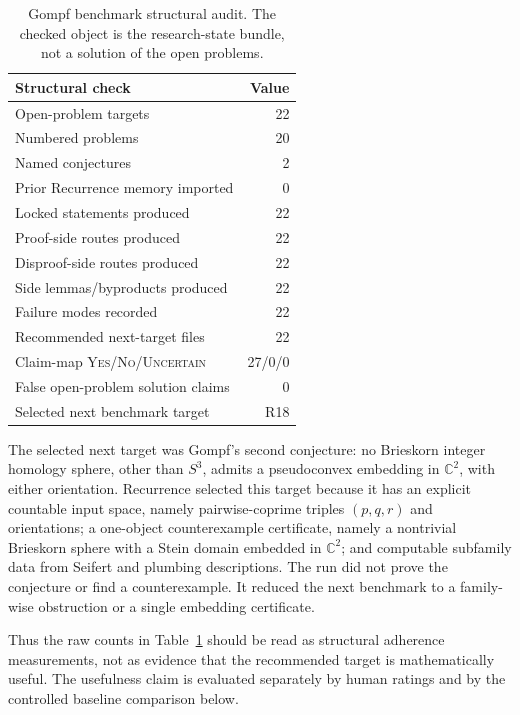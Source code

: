 \documentclass{article}
\theoremstyle{definition}
\theoremstyle{remark}
\begin{document}
\begin{table}[t]
  \caption{Gompf benchmark structural audit. The checked object is the research-state bundle, not a solution of the open problems.}
  \label{tab:gompf-summary}
  \vskip 0.08in
  \centering
  \begin{footnotesize}
  \setlength{\tabcolsep}{4pt}
  \begin{tabular}{lr}
    \toprule
    Structural check & Value \\
    \midrule
    Open-problem targets & 22 \\
    Numbered problems & 20 \\
    Named conjectures & 2 \\
    Prior Recurrence memory imported & 0 \\
    Locked statements produced & 22 \\
    Proof-side routes produced & 22 \\
    Disproof-side routes produced & 22 \\
    Side lemmas/byproducts produced & 22 \\
    Failure modes recorded & 22 \\
    Recommended next-target files & 22 \\
    Claim-map \textsc{Yes}/\textsc{No}/\textsc{Uncertain} & 27/0/0 \\
    False open-problem solution claims & 0 \\
    Selected next benchmark target & R18 \\
    \bottomrule
  \end{tabular}
  \end{footnotesize}
\end{table}

The selected next target was Gompf's second conjecture: no Brieskorn integer homology sphere, other than \(S^3\), admits a pseudoconvex embedding in \(\mathbb{C}^2\), with either orientation. Recurrence selected this target because it has an explicit countable input space, namely pairwise-coprime triples \((p,q,r)\) and orientations; a one-object counterexample certificate, namely a nontrivial Brieskorn sphere with a Stein domain embedded in \(\mathbb{C}^2\); and computable subfamily data from Seifert and plumbing descriptions. The run did not prove the conjecture or find a counterexample. It reduced the next benchmark to a family-wise obstruction or a single embedding certificate.

Thus the raw counts in Table~\ref{tab:gompf-summary} should be read as structural adherence measurements, not as evidence that the recommended target is mathematically useful. The usefulness claim is evaluated separately by human ratings and by the controlled baseline comparison below.
\end{document}
